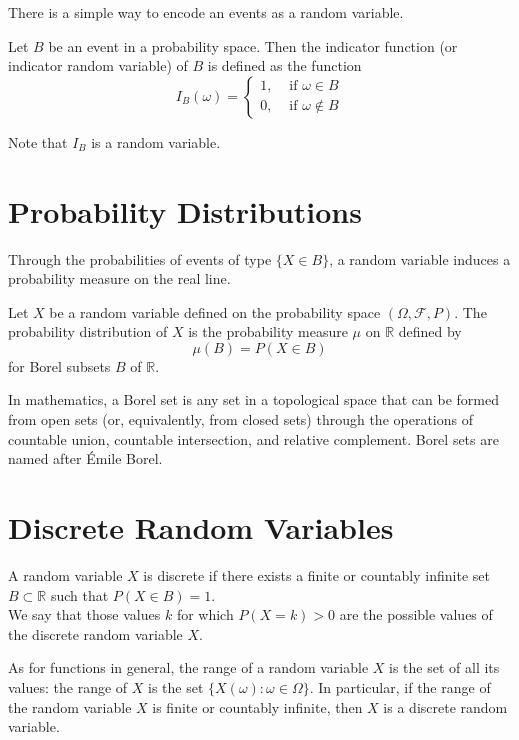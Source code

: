 \documentclass[11pt]{elegantbook}
\begin{document}
There is a simple way to encode an events as a random variable.

\begin{definition}
 Let $B$ be an event in a probability space. Then the indicator function (or indicator random variable) of $B$ is defined as the function
$$
I_B(\omega)= \begin{cases}1, & \text { if } \omega \in B \\ 0, & \text { if } \omega \notin B\end{cases}
$$
\end{definition}

\begin{note}
Note that $I_B$ is a random variable.
\end{note}
\section{Probability Distributions}

Through the probabilities of events of type $\{X \in B\}$, a random variable induces a probability measure on the real line.

\begin{definition}
Let $X$ be a random variable defined on the probability space $(\Omega, \mathcal{F}, P)$. The probability distribution of $X$ is the probability measure $\mu$ on $\mathbb{R}$ defined by
$$
\mu(B)=P(X \in B)
$$
for Borel subsets $B$ of $\mathbb{R}$.
\end{definition}

\begin{note}
    In mathematics, a Borel set is any set in a topological space that can be formed from open sets (or, equivalently, from closed sets) through the operations of countable union, countable intersection, and relative complement. Borel sets are named after Émile Borel.
\end{note}

\section{Discrete Random Variables}

\begin{definition}
A random variable $X$ is discrete if there exists a finite or countably infinite set $B \subset \mathbb{R}$ such that $P(X \in B)=1$.\\

We say that those values $k$ for which $P(X=k)>0$ are the possible values of the discrete random variable $X$.

As for functions in general, the range of a random variable $X$ is the set of all its values: the range of $X$ is the set $\{X(\omega): \omega \in \Omega\}$. In particular, if the range of
the random variable $X$ is finite or countably infinite, then $X$ is a discrete random variable.
\end{definition}
\end{document}
